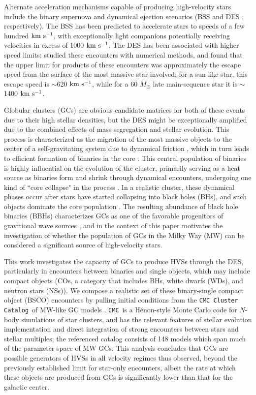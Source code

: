 \documentclass[twocolumn]{aastex631}
\newcommand{\kms}{${\rm km~s^{-1}}$}
\newcommand{\CMC}{\texttt{CMC}}
\newcommand{\CMCcat}{\texttt{CMC Cluster Catalog}}
\begin{document}
Alternate acceleration mechanisms capable of producing high-velocity stars include the binary supernova and dynamical ejection scenarios (BSS \citep{1967BOTT....4...86P} and DES \citep{1961BAN....15..265B}, respectively).
The BSS has been predicted to accelerate stars to speeds of a few hundred \kms \citep{2019A&A...624A..66R}, with exceptionally light companions potentially receiving velocities in excess of 1000 \kms \citep{2015MNRAS.448L...6T}.
The DES has been associated with higher speed limits: \citet{1991AJ....101..562L} studied these encounters with numerical methods, and found that the upper limit for products of these encounters was approximately the escape speed from the surface of the most massive star involved; for a sun-like star, this escape speed is $\sim$620 \kms, while for a 60 $M_\odot$ late main-sequence star it is $\sim$1400 \kms.

Globular clusters (GCs) are obvious candidate matrices for both of these events due to their high stellar densities, but the DES might be exceptionally amplified due to the combined effects of mass segregation and stellar evolution.
This process is characterized as the migration of the most massive objects to the center of a self-gravitating system due to dynamical friction \citep{2008gady.book.....B}, which in turn leads to efficient formation of binaries in the core \citep{2005MNRAS.358..572I}.
This central population of binaries is highly influential on the evolution of the cluster, primarily serving as a heat source as binaries form and shrink through dynamical encounters, undergoing one kind of ``core collapse" in the process \citep[e.g.][]{2007ApJ...658.1047F, 2013MNRAS.429.2881C}.
In a realistic cluster, these dynamical phases occur after stars have started collapsing into black holes (BHs), and such objects dominate the core population \citep{2020IAUS..351..357K}.
The resulting abundance of black hole binaries (BBHs) characterizes GCs as one of the favorable progenitors of gravitional wave sources \citep{2000ApJ...528L..17P, 2015PhRvL.115e1101R}, and in the context of this paper motivates the investigation of whether the population of GCs in the Milky Way (MW) can be considered a significant source of high-velocity stars.

This work investigates the capacity of GCs to produce HVSs through the DES, particularly in encounters between binaries and single objects, which may include compact objects (COs, a category that includes BHs, white dwarfs (WDs), and neutron stars (NSs)).
We compose a realistic set of these binary-single compact object (BSCO) encounters by pulling initial conditions from the \CMCcat\ of MW-like GC models \citep{2020ApJS..247...48K}.
\CMC\ is a H\'enon-style Monte Carlo code for $N$-body simulations of star clusters, and has the relevant features of stellar evolution implementation and direct integration of strong encounters between stars and stellar multiples; the referenced catalog consists of 148 models which span much of the parameter space of MW GCs.
This analysis concludes that GCs are possible generators of HVSs in all velocity regimes thus observed, beyond the previously established limit for star-only encounters, albeit the rate at which these objects are produced from GCs is significantly lower than that for the galactic center.
\end{document}
